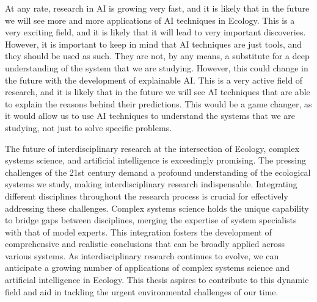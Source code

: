 At any rate, research in AI is growing very fast, and it is likely that in the
future we will see more and more applications of AI techniques in Ecology. This
is a very exciting field, and it is likely that it will lead to very important
discoveries. However, it is important to keep in mind that AI techniques are
just tools, and they should be used as such. They are not, by any means, a
substitute for a deep understanding of the system that we are studying.
However, this could change in the future with the development of explainable
AI. This is a very active field of research, and it is likely that in the
future
we will see AI techniques that are able to explain the reasons behind their
predictions. This would be a game changer, as it would allow us to use AI
techniques to understand the systems that we are studying, not just to solve
specific problems.

The future of interdisciplinary research at the intersection of Ecology,
complex systems science, and artificial intelligence is exceedingly promising.
The pressing challenges of the 21st century demand a profound understanding of
the ecological systems we study, making interdisciplinary research
indispensable. Integrating different disciplines throughout the research
process is crucial for effectively addressing these challenges. Complex systems
science holds the unique capability to bridge gaps between disciplines, merging
the expertise of system specialists with that of model experts. This
integration fosters the development of comprehensive and realistic conclusions
that can be broadly applied across various systems. As interdisciplinary
research continues to evolve, we can anticipate a growing number of
applications of complex systems science and artificial intelligence in Ecology.
This thesis aspires to contribute to this dynamic field and aid in tackling the
urgent environmental challenges of our time.
